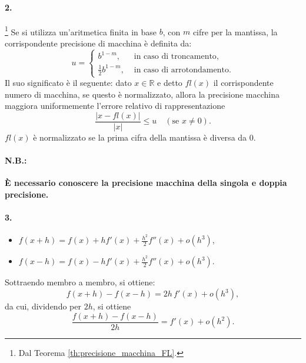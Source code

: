 \paragraph{2.} \footnote{Dal Teorema \ref{th:precisione_macchina_FL}.} Se si utilizza un'aritmetica finita in base $b$, con $m$ cifre per la mantissa, la corrispondente precisione di macchina è definita da:
\begin{equation*}
	u=
	\begin{cases}
		b^{1-m}, &\text{ in caso di troncamento},\\
		\frac{1}{2}b^{1-m}, &\text{ in caso di arrotondamento}.
	\end{cases}
\end{equation*}
Il suo significato è il seguente: dato $x\in\mathbb R$ e detto $fl(x)$ il corrispondente numero di macchina, se questo è normalizzato, allora la precisione macchina \gls{maggiora uniformemente} l'errore relativo di rappresentazione
\begin{equation*}
	\frac{|x-fl(x)|}{|x|}\leq u\quad (\text{se } x\neq 0).
\end{equation*}
$fl(x)$ è normalizzato se la prima cifra della mantissa è diversa da 0.

\paragraph{N.B.:} \textbf{È necessario conoscere la precisione macchina della singola e doppia precisione.}

\paragraph{3.}
\begin{itemize}
	\item $f(x+h)=f(x)+hf'(x)+\frac{h^2}{2}f''(x)+o(h^3)$,
	\item $f(x-h)=f(x)-hf'(x)+\frac{h^2}{2}f''(x)+o(h^3)$.
\end{itemize}
Sottraendo membro a membro, si ottiene:
\begin{equation*}
	f(x+h)-f(x-h)=2h\,f'(x)+o(h^3),
\end{equation*}
da cui, dividendo per $2h$, si ottiene
\begin{equation*}
	\frac{f(x+h)-f(x-h)}{2h}=f'(x)+o(h^2).
\end{equation*}

